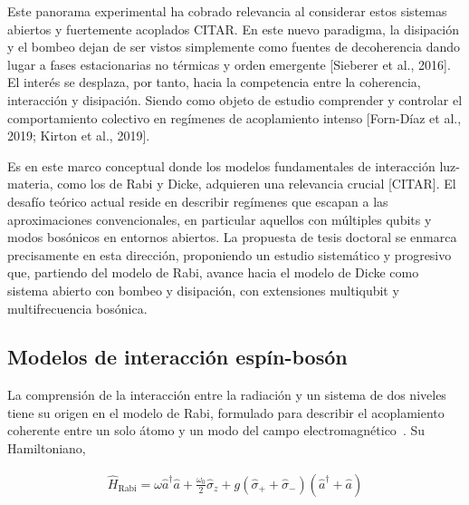 \documentclass[onecolumn,notitlepage,letterpaper,aps,pra,12pt]{article}
\numberwithin{equation}{section}
\begin{document}
Este panorama experimental ha cobrado  relevancia al considerar estos sistemas  abiertos y fuertemente acoplados CITAR. En este nuevo paradigma, la disipación y el bombeo dejan de ser vistos simplemente como fuentes de decoherencia  dando lugar a fases estacionarias no térmicas y orden emergente [Sieberer et al., 2016]. El interés se desplaza, por tanto, hacia la competencia entre la coherencia, interacción y disipación. Siendo como objeto de estudio comprender y controlar el comportamiento colectivo en regímenes de acoplamiento intenso [Forn-Díaz et al., 2019; Kirton et al., 2019]. 

Es en este marco conceptual donde los modelos fundamentales de interacción luz-materia, como los de Rabi y Dicke, adquieren una relevancia crucial [CITAR]. El desafío teórico actual reside en describir regímenes que escapan a las aproximaciones convencionales, en particular aquellos con múltiples qubits y modos bosónicos en entornos abiertos. La propuesta de tesis doctoral se enmarca precisamente en esta dirección, proponiendo un estudio sistemático y progresivo que, partiendo del modelo de Rabi, avance hacia el modelo de Dicke como sistema abierto con bombeo y disipación, con extensiones multiqubit y multifrecuencia bosónica.




\subsection{Modelos de interacción espín-bosón}


La comprensión de la interacción entre la radiación y un sistema de dos niveles tiene su origen en el modelo de Rabi, formulado para describir el acoplamiento coherente entre un solo átomo y un modo del campo electromagnético~\cite{rabi1936}. Su Hamiltoniano,

\begin{gather}
    \hat{H}_{\text{Rabi}} = \omega\hat{a}^{\dagger}\hat{a} + \frac{\omega_{0}}{2}\hat{\sigma}_{z} + g\left( \hat{\sigma}_{+} + \hat{\sigma}_{-} \right)\left( \hat{a}^{\dagger} + \hat{a} \right)
\end{gather}
\end{document}
